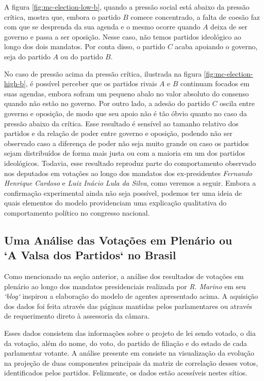 A figura \ref{fig:mc-election-low-b}, quando a pressão social está abaixo da pressão crítica, mostra que, embora o partido $B$ comece concentrado, a falta de coesão faz com que se desprenda da sua agenda e o mesmo ocorre quando $A$ deixa de ser governo e passa a ser oposição.
Nesse caso, não temos partidos ideológico ao longo dos dois mandatos.
Por conta disso, o partido $C$ acaba apoiando o governo, seja do partido $A$ ou do partido $B$.

No caso de pressão acima da pressão crítica, ilustrada na figura \ref{fig:mc-election-high-b}, é possível perceber que os partidos rivais $A$ e $B$ continuam focados em suas agendas, embora sofram um pequeno abalo no valor absoluto do consenso quando não estão no governo.
Por outro lado, a adesão do partido $C$ oscila entre governo e oposição, de modo que seu apoio não é tão óbvio quanto no caso da pressão abaixo da crítica.
Esse resultado é sensível ao tamanho relativo dos partidos e da relação de poder entre governo e oposição, podendo não ser observado caso a diferença de poder não seja muito grande ou caso os partidos sejam distribuídos de forma mais justa ou com a maioria em um dos partidos ideológicos.
Todavia, esse resultado reproduz parte do comportamento observado nos deputados em votações ao longo dos mandatos dos ex-presidentes \emph{Fernando Henrique Cardoso} e \emph{Luiz Inácio Lula da Silva}, como veremos a seguir.
Embora a confirmação experimental ainda não seja possível, podemos ter uma ideia de quais elementos do modelo providenciam uma explicação qualitativa do comportamento político no congresso nacional.

\subsection{Uma Análise das Votações em Plenário ou\\
            `A Valsa dos Partidos` no Brasil}


Como mencionado na seção anterior, a análise dos resultados de votações em plenário ao longo dos mandatos presidenciais realizada por \emph{R. Marino} em seu \emph{`blog`} inspirou a elaboração do modelo de agentes apresentado acima.
A aquisição dos dados foi feita através das páginas mantidas pelos parlamentares ou através de requerimento direto à assessoria da câmara.

Esses dados consistem das informações sobre o projeto de lei sendo votado, o dia da votação, além do nome, do voto, do partido de filiação e do estado de cada parlamentar votante.
A análise presente em \parencite{MarinoBlog1, MarinoBlog2} consiste na visualização da evolução na projeção de duas componentes principais da matriz de correlação desses votos, identificados pelos partidos.
Felizmente, os dados estão acessíveis nestes sítios.

